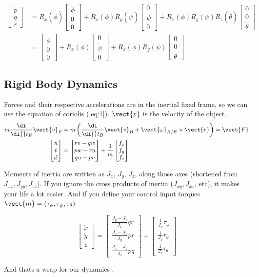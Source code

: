 \documentclass{article}
\newcommand{\diff}[1]{\frac{\di}{\di{}t_{#1}}}
\newcommand{\cvec}[1]{\begin{bmatrix}
    #1
\end{bmatrix}}
\begin{document}
\begin{equation}
    \begin{split}
        \cvec{p\\q\\r} &= R_x(\dot\phi)\cvec{\dot\phi\\0\\0} 
        + R_x(\phi)R_y(\dot\psi)\cvec{0\\\dot\psi\\0}
        + R_x(\phi)R_y(\psi)R_z(\dot\theta)\cvec{0\\0\\\dot\theta}\\
        &=\cvec{\dot\phi\\0\\0} 
        + R_x(\phi)\cvec{0\\\dot\psi\\0}
        + R_x(\phi)R_y(\psi)\cvec{0\\0\\\dot\theta}
    \end{split}
\end{equation}
\subsection{Rigid Body Dynamics}
Forces and their respective accelerations are in the inertial fixed frame, so we can use the equation of coriolis (\ref{eq:1}). $\vect{v}$ is the velocity of the object. 
\begin{equation}
    \begin{split}
        m\diff{E}\vect{v}_E &=m\left(\diff{B}\vect{v}_B + \vect{\omega}_{B/E} \times \vect{v} \right) = \vect{F} \\
        \cvec{\dot u \\ \dot v \\ \dot w} &= \cvec{rv-qw \\ pw-ru \\ qu - pv} + \frac{1}{m} \cvec{f_x \\ f_y \\ f_z}
    \end{split}
\end{equation}

Moments of inertia are written as $J_x$, $J_y$, $J_z$, along those axes (shortened from $J_{xx}, J_{yy}, J_{zz}$). If you ignore the cross products of inertia ($J_{xy}, J_{xz}$, etc), it makes your life a lot easier. And if you define your control input torques $\vect{m} = \left(\tau_{\phi}, \tau_{\psi}, \tau_{\theta} \right)$

\begin{equation}
    \cvec{\dot x \\ \dot y \\ \dot z} = 
    \cvec{ \frac{J_y - J_z}{J_x}qr 
        \\ \frac{J_z - J_x}{J_y}pr 
        \\ \frac{J_x - J_y}{J_z}pq}
    + \cvec{ \frac{1}{J_x} \tau_{\phi} \\ 
             \frac{1}{J_y} \tau_{\psi} \\ 
             \frac{1}{J_z} \tau_{\theta}}
\end{equation}

And thats a wrap for our dynamics \dSmiley.
\end{document}
